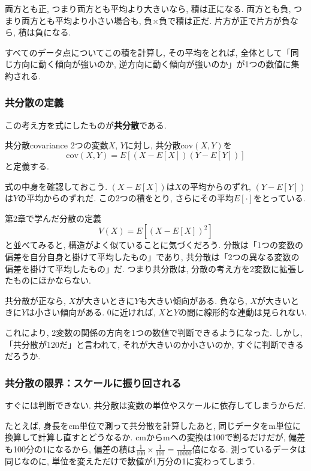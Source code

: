 両方とも正, つまり両方とも平均より大きいなら, 積は正になる.
両方とも負, つまり両方とも平均より小さい場合も, 負$\times$負で積は正だ.
片方が正で片方が負なら, 積は負になる.

すべてのデータ点についてこの積を計算し, その平均をとれば, 全体として「同じ方向に動く傾向が強いのか, 逆方向に動く傾向が強いのか」が1つの数値に集約される.

\subsubsection*{共分散の定義}

この考え方を式にしたものが\textbf{共分散}である.

\begin{defi}[]{共分散}{covariance}
2つの変数$X$, $Y$に対し, 共分散$\mathrm{cov}(X,Y)$を
\[
\mathrm{cov}(X,Y) = E[(X - E[X])(Y - E[Y])]
\]
と定義する.
\end{defi}

式の中身を確認しておこう.
$(X - E[X])$は$X$の平均からのずれ, $(Y - E[Y])$は$Y$の平均からのずれだ.
この2つの積をとり, さらにその平均$E[\cdot]$をとっている.

第2章で学んだ分散の定義
\[
V(X) = E[(X - E[X])^2]
\]
と並べてみると, 構造がよく似ていることに気づくだろう.
分散は「1つの変数の偏差を自分自身と掛けて平均したもの」であり, 共分散は「2つの異なる変数の偏差を掛けて平均したもの」だ.
つまり共分散は, 分散の考え方を2変数に拡張したものにほかならない.

共分散が正なら, $X$が大きいときに$Y$も大きい傾向がある.
負なら, $X$が大きいときに$Y$は小さい傾向がある.
0に近ければ, $X$と$Y$の間に線形的な連動は見られない.

これにより, 2変数の関係の方向を1つの数値で判断できるようになった.
しかし, 「共分散が120だ」と言われて, それが大きいのか小さいのか, すぐに判断できるだろうか.

\subsubsection*{共分散の限界：スケールに振り回される}

すぐには判断できない. 共分散は変数の単位やスケールに依存してしまうからだ.

たとえば, 身長をcm単位で測って共分散を計算したあと, 同じデータをm単位に換算して計算し直すとどうなるか.
cmからmへの変換は100で割るだけだが, 偏差も100分の1になるから, 偏差の積は$\frac{1}{100} \times \frac{1}{100} = \frac{1}{10000}$倍になる.
測っているデータは同じなのに, 単位を変えただけで数値が1万分の1に変わってしまう.

